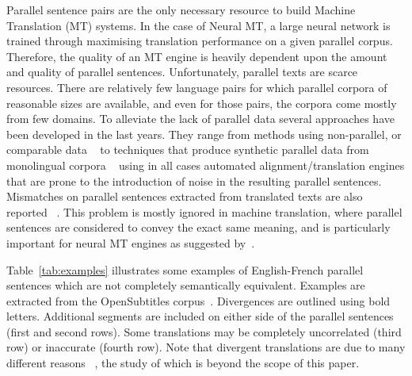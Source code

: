 \documentclass[11pt,a4paper]{article}
\begin{document}
Parallel sentence pairs are the only necessary resource to build Machine Translation (MT) systems. 
In the case of Neural MT, a large neural network is trained through maximising translation performance on a given parallel corpus. 
Therefore, the quality of an MT engine is heavily dependent upon the amount and quality of parallel sentences. 
Unfortunately, parallel texts are scarce resources. 
There are relatively few language pairs for which parallel corpora of reasonable sizes are available, and even for those pairs, the corpora come mostly from few domains. 
To alleviate the lack of parallel data several approaches have been developed in the last years. 
They range from methods using non-parallel, or comparable data ~\cite{Zhao:2002:APS:844380.844785,W04-3208,J05-4003,W17-2509,P17-3003} to techniques that produce synthetic parallel data from monolingual corpora ~\cite{P16-1009,W17-4714} using in all cases automated alignment/translation engines that are prone to the introduction of noise in the resulting parallel sentences. 
Mismatches on parallel sentences extracted from translated texts are also reported ~\cite{tiedemann2011bitext,XU16.310}. 
This problem is mostly ignored in machine translation, where parallel sentences are considered to convey the exact same meaning, and is particularly important for neural MT engines as suggested by~\cite{chen2016adaptation}.

Table~\ref{tab:examples} illustrates some examples of English-French parallel sentences which are not completely semantically equivalent. Examples are extracted from the OpenSubtitles corpus~\cite{LisonTiedemann2016}. 
Divergences are outlined using bold letters. 
Additional segments are included on either side of the parallel sentences (first and second rows). 
Some translations may be completely uncorrelated (third row) or inaccurate (fourth row).
Note that divergent translations are due to many different reasons ~\cite{C14-1055}, the study of which is beyond the scope of this paper.
\end{document}
